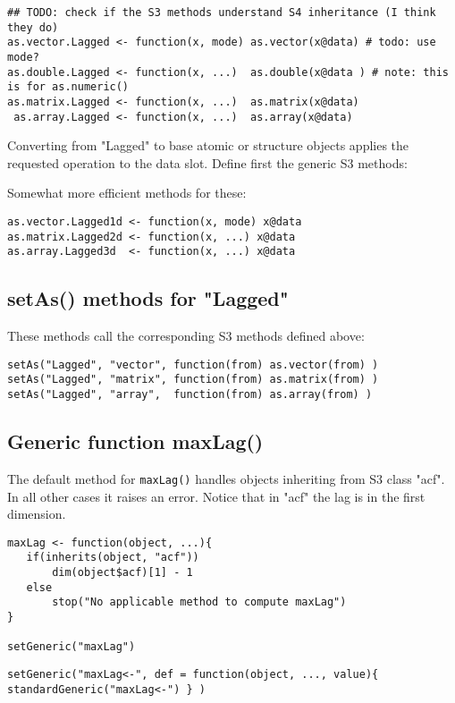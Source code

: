 \documentclass[11pt,a4paper]{article}
\begin{document}
\begin{verbatim}
## TODO: check if the S3 methods understand S4 inheritance (I think they do)
as.vector.Lagged <- function(x, mode) as.vector(x@data) # todo: use mode?
as.double.Lagged <- function(x, ...)  as.double(x@data ) # note: this is for as.numeric()
as.matrix.Lagged <- function(x, ...)  as.matrix(x@data)
 as.array.Lagged <- function(x, ...)  as.array(x@data)
\end{verbatim}
Converting from "Lagged" to base atomic or structure objects applies the requested
operation to the data slot. Define first the generic S3 methods:

Somewhat more efficient methods for these:
\begin{verbatim}
as.vector.Lagged1d <- function(x, mode) x@data
as.matrix.Lagged2d <- function(x, ...) x@data
as.array.Lagged3d  <- function(x, ...) x@data
\end{verbatim}


\subsection{setAs() methods for "Lagged"}
\label{sec:org1436e9d}

These methods call the corresponding S3 methods defined above:
\begin{verbatim}
setAs("Lagged", "vector", function(from) as.vector(from) )
setAs("Lagged", "matrix", function(from) as.matrix(from) )
setAs("Lagged", "array",  function(from) as.array(from) )
\end{verbatim}



\subsection{Generic function maxLag()}
\label{sec:org4f09cdf}

The default method for \texttt{maxLag()} handles objects inheriting from S3 class "acf". In all
other cases it raises an error. Notice that in "acf" the lag is in the first dimension.
\begin{verbatim}
maxLag <- function(object, ...){
   if(inherits(object, "acf"))
       dim(object$acf)[1] - 1
   else
       stop("No applicable method to compute maxLag")
}

setGeneric("maxLag")
\end{verbatim}

\begin{verbatim}
setGeneric("maxLag<-", def = function(object, ..., value){ standardGeneric("maxLag<-") } )
\end{verbatim}
\end{document}
